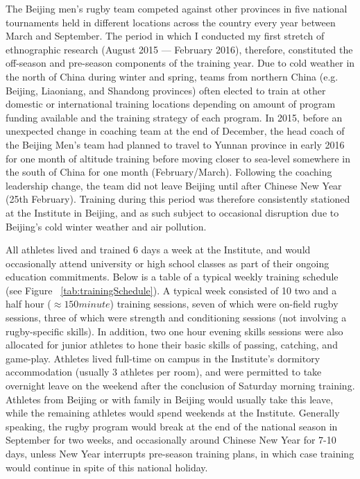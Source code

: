 \begin{CJK}{UTF8}{gbsn}
 The Beijing men's rugby team competed against other provinces in five national tournaments held in different locations across the country every year between March and September.  The period in which I conducted my first stretch of ethnographic research (August 2015 --- February 2016), therefore, constituted the off-season and pre-season components of the training year.  Due to cold weather in the north of China during winter and spring, teams from northern China (e.g. Beijing, Liaoniang, and Shandong provinces) often elected to train at other domestic or international training locations depending on amount of program funding available and the training strategy of each program.  In 2015, before an unexpected change in coaching team at the end of December, the head coach of the Beijing Men's team had planned to travel to Yunnan province in early 2016 for one month of altitude training before moving closer to sea-level somewhere in the south of China for one month (February/March).  Following the coaching leadership change, the team did not leave Beijing until after Chinese New Year (25th February). Training during this period was therefore consistently stationed at the Institute in Beijing, and as such subject to occasional disruption due to Beijing's cold winter weather and air pollution.

 All athletes lived and trained 6 days a week at the Institute, and would occasionally attend university or high school classes as part of their ongoing education commitments.  Below is a table of a typical weekly training schedule (see Figure ~\ref{tab:trainingSchedule}). A typical week consisted of 10 two and a half hour ($\approx 150 minute$) training sessions, seven of which were on-field rugby sessions, three of which were strength and conditioning sessions (not involving a rugby-specific skills).  In addition, two one hour evening skills sessions were also allocated for junior athletes to hone their basic skills of passing, catching, and game-play.  Athletes lived full-time on campus in the Institute's dormitory accommodation (usually 3 athletes per room), and were permitted to take overnight leave on the weekend after the conclusion of Saturday morning training.  Athletes from Beijing or with family in Beijing would usually take this leave, while the remaining athletes would spend weekends at the Institute.  Generally speaking, the rugby program would break at the end of the national season in September for two weeks, and occasionally around Chinese New Year for 7-10 days, unless New Year interrupts pre-season training plans, in which case training would continue in spite of this national holiday.


\end{CJK}

